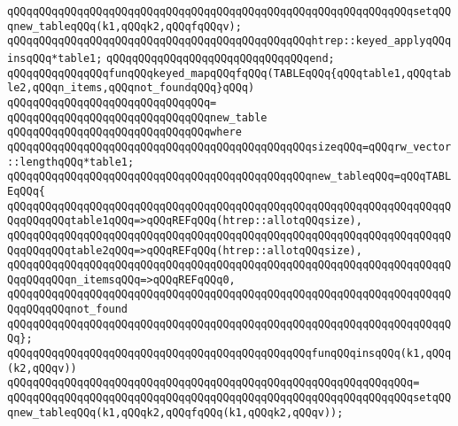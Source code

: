 \verb|qQQqqQQqqQQqqQQqqQQqqQQqqQQqqQQqqQQqqQQqqQQqqQQqqQQqqQQqqQQqqQQqsetqQQqnew_tableqQQq(k1,qQQqk2,qQQqfqQQqv);|\newline
\newline
\verb|qQQqqQQqqQQqqQQqqQQqqQQqqQQqqQQqqQQqqQQqqQQqqQQqhtrep::keyed_applyqQQqinsqQQq*table1;|\newline
\verb|qQQqqQQqqQQqqQQqqQQqqQQqqQQqqQQqend;|\newline
\newline
\verb|qQQqqQQqqQQqqQQqfunqQQqkeyed_mapqQQqfqQQq(TABLEqQQq{qQQqtable1,qQQqtable2,qQQqn_items,qQQqnot_foundqQQq}qQQq)|\newline
\verb|qQQqqQQqqQQqqQQqqQQqqQQqqQQqqQQq=|\newline
\verb|qQQqqQQqqQQqqQQqqQQqqQQqqQQqqQQqnew_table|\newline
\verb|qQQqqQQqqQQqqQQqqQQqqQQqqQQqqQQqwhere|\newline
\verb|qQQqqQQqqQQqqQQqqQQqqQQqqQQqqQQqqQQqqQQqqQQqqQQqsizeqQQq=qQQqrw_vector::lengthqQQq*table1;|\newline
\newline
\verb|qQQqqQQqqQQqqQQqqQQqqQQqqQQqqQQqqQQqqQQqqQQqqQQqnew_tableqQQq=qQQqTABLEqQQq{|\newline
\verb|qQQqqQQqqQQqqQQqqQQqqQQqqQQqqQQqqQQqqQQqqQQqqQQqqQQqqQQqqQQqqQQqqQQqqQQqqQQqqQQqtable1qQQq=>qQQqREFqQQq(htrep::allotqQQqsize),|\newline
\verb|qQQqqQQqqQQqqQQqqQQqqQQqqQQqqQQqqQQqqQQqqQQqqQQqqQQqqQQqqQQqqQQqqQQqqQQqqQQqqQQqtable2qQQq=>qQQqREFqQQq(htrep::allotqQQqsize),|\newline
\verb|qQQqqQQqqQQqqQQqqQQqqQQqqQQqqQQqqQQqqQQqqQQqqQQqqQQqqQQqqQQqqQQqqQQqqQQqqQQqqQQqn_itemsqQQq=>qQQqREFqQQq0,|\newline
\verb|qQQqqQQqqQQqqQQqqQQqqQQqqQQqqQQqqQQqqQQqqQQqqQQqqQQqqQQqqQQqqQQqqQQqqQQqqQQqqQQqnot_found|\newline
\verb|qQQqqQQqqQQqqQQqqQQqqQQqqQQqqQQqqQQqqQQqqQQqqQQqqQQqqQQqqQQqqQQqqQQqqQQq};|\newline
\newline
\verb|qQQqqQQqqQQqqQQqqQQqqQQqqQQqqQQqqQQqqQQqqQQqqQQqfunqQQqinsqQQq(k1,qQQq(k2,qQQqv))|\newline
\verb|qQQqqQQqqQQqqQQqqQQqqQQqqQQqqQQqqQQqqQQqqQQqqQQqqQQqqQQqqQQqqQQq=|\newline
\verb|qQQqqQQqqQQqqQQqqQQqqQQqqQQqqQQqqQQqqQQqqQQqqQQqqQQqqQQqqQQqqQQqsetqQQqnew_tableqQQq(k1,qQQqk2,qQQqfqQQq(k1,qQQqk2,qQQqv));|\newline
\newline

